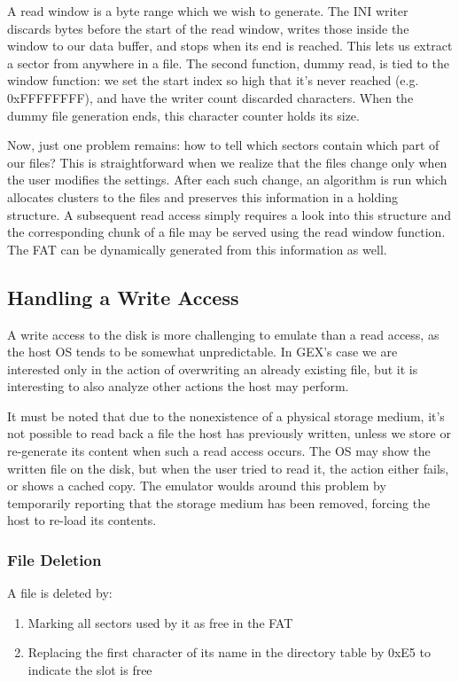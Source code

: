 A read window is a byte range which we wish to generate. The INI writer discards bytes before the start of the read window, writes those inside the window to our data buffer, and stops when its end is reached. This lets us extract a sector from anywhere in a file. The second function, dummy read, is tied to the window function: we set the start index so high that it's never reached (e.g. 0xFFFFFFFF), and have the writer count discarded characters. When the dummy file generation ends, this character counter holds its size.

Now, just one problem remains: how to tell which sectors contain which part of our files? This is straightforward when we realize that the files change only when the user modifies the settings. After each such change, an algorithm is run which allocates clusters to the files and preserves this information in a holding structure. A subsequent read access simply requires a look into this structure and the corresponding chunk of a file may be served using the read window function. The \gls{FAT} can be dynamically generated from this information as well.

\subsection{Handling a Write Access}

A write access to the disk is more challenging to emulate than a read access, as the host OS tends to be somewhat unpredictable. In GEX's case we are interested only in the action of overwriting an already existing file, but it is interesting to also analyze other actions the host may perform.

It must be noted that due to the nonexistence of a physical storage medium, it's not possible to read back a file the host has previously written, unless we store or re-generate its content when such a read access occurs. The \gls{OS} may show the written file on the disk, but when the user tried to read it, the action either fails, or shows a cached copy. The emulator woulds around this problem by temporarily reporting that the storage medium has been removed, forcing the host to re-load its contents.

\subsubsection{File Deletion}

A file is deleted by:

\begin{enumerate}
	\item Marking all sectors used by it as free in the \gls{FAT}
	\item Replacing the first character of its name in the directory table by 0xE5 to indicate the slot is free
\end{enumerate}


